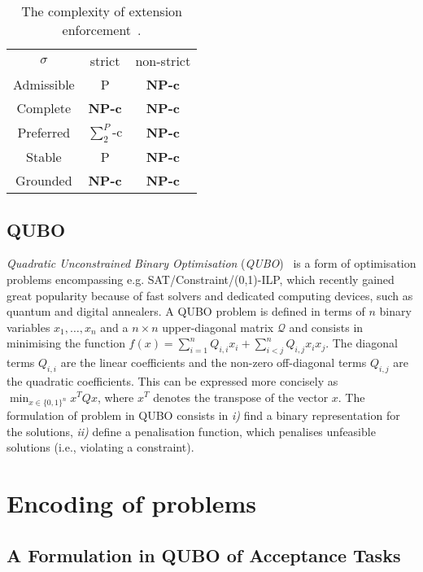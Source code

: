 \documentclass[conference,compsocconf]{IEEEtran}
\begin{document}
\begin{table}[t]
	\centering
	\footnotesize
	\begin{tabular}{ccc}
		$\sigma$ &  strict & non-strict  \\
		Admissible & P  & \bf{NP-c}   \\
		Complete & \bf{NP-c} &  \bf{NP-c}  \\
		Preferred & $\sum^{P}_{2}$-c  &  \bf{NP-c}  \\
		Stable &  P & \bf{NP-c}  \\
		Grounded & \bf{NP-c} & \bf{NP-c}
	\end{tabular}
	\caption{The complexity of extension enforcement~\cite{extenf}.}
	\label{sec:complexity2}
	\vspace{-0.5cm}
\end{table}


\subsection{QUBO}\label{sect:qubo}
\emph{Quadratic Unconstrained Binary Optimisation} (\emph{QUBO})~\cite{glover} is a
form of optimisation problems encompassing e.g. SAT/Constraint/(0,1)-ILP, which  recently gained great popularity because of fast solvers and dedicated computing devices, such as
quantum and digital annealers. 
A QUBO problem is defined in terms of $n$ binary variables $x_1,\dots,x_n$
and a $n\times n$ upper-diagonal matrix $\mathcal{Q}$ and consists in 
minimising the function $f(x) = \sum_{i=1}^n Q_{i,i} x_i + \sum_{i < j}^n Q_{i,j} x_i x_j$.
The diagonal terms $Q_{i,i}$ are the linear coefficients and the non-zero off-diagonal terms $Q_{i,j}$
are the quadratic coefficients. This can be expressed more concisely as $\min_{x \in \{0,1\}^n} x^T Q x$, where $x^T$ denotes the transpose of the vector $x$. The formulation of problem in QUBO
consists in  \emph{i)}  find a binary representation for the solutions, \emph{ii)}  define a penalisation function, which penalises unfeasible solutions (i.e., violating a constraint).

\section{Encoding of problems}\label{sect:encoding}

\subsection{A Formulation in QUBO of  Acceptance Tasks}
\end{document}
